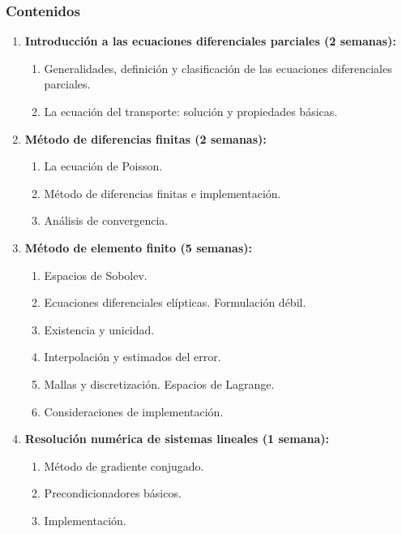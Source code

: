 \begin{refsection}
\subsubsection*{Contenidos}

\begin{enumerate}

\item \textbf{Introducción a las ecuaciones diferenciales parciales (2 semanas):}
\begin{enumerate}
    \item Generalidades, definición y clasificación de las ecuaciones diferenciales parciales.
    \item La ecuación del transporte: solución y propiedades básicas.
\end{enumerate}

\item \textbf{Método de diferencias finitas (2 semanas):}
\begin{enumerate}
    \item La ecuación de Poisson.
    \item Método de diferencias finitas e implementación.
    \item Análisis de convergencia.
\end{enumerate}

\item \textbf{Método de elemento finito (5 semanas):}
\begin{enumerate}
    \item Espacios de Sobolev.
    \item Ecuaciones diferenciales elípticas. Formulación débil.
    \item Existencia y unicidad.
    \item Interpolación y estimados del error.
    \item Mallas y discretización. Espacios de Lagrange.
    \item Consideraciones de implementación.
\end{enumerate}

\item \textbf{Resolución numérica de sistemas lineales (1 semana):}
\begin{enumerate}
    \item Método de gradiente conjugado.
    \item Precondicionadores básicos.
    \item Implementación.
\end{enumerate}


\end{enumerate}
\end{refsection}
